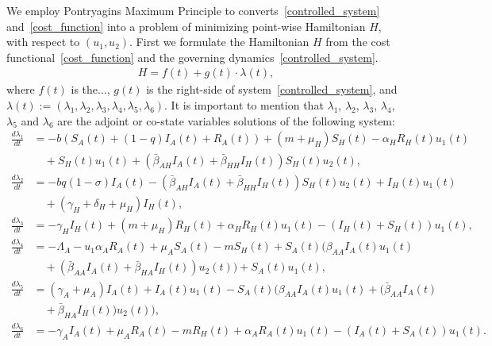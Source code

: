\documentclass[11pt]{amsart}
\theoremstyle{definition}
\numberwithin{equation}{section}
\begin{document}
    We employ Pontryagins Maximum Principle to converts~\eqref{controlled_system} and~\eqref{cost_function} into a problem of minimizing point-wise Hamiltonian $H$, with respect to $(u_{1},u_{2})$. First we formulate the Hamiltonian $H$ from the cost functional~\eqref{cost_function} and the governing dynamics~\eqref{controlled_system}.
    \begin{equation}
        \begin{aligned}
            H = f(t) + g(t)\cdot \lambda(t),
         \end{aligned}
    \end{equation}
    where $f(t)$ is the..., $g(t)$ is the right-side of system~\eqref{controlled_system}, and $\lambda(t) := \left( \lambda_{1}, \lambda_{2}, \lambda_{3}, \lambda_{4}, \lambda_{5}, \lambda_{6} \right)$. It is important to mention that $\lambda_{1}$, $\lambda_{2}$, $\lambda_{3}$, $\lambda_{4}$, $\lambda_{5}$ and $\lambda_{6}$ are the adjoint or co-state variables solutions of the following system:
    \begin{equation}\label{adjoint_system}
    \begin{aligned}
        \frac{d \lambda_{1}}{dt} &=
        -b (S_{A}(t) + (1 - q) I_{A}(t) + R_{A}(t) ) + (m + \mu_{H}) S_{H}(t) - \alpha_{H} R_{H}(t) u_{1}(t)\\
        &\quad+ S_{H}(t) u_{1}(t) + (\bar{\beta}_{AH} I_{A}(t) + \bar{\beta}_{HH} I_{H}(t)) S_{H}(t) u_{2}(t),
        \\
        \frac{d \lambda_{2}}{dt} &=
        -b q (1 - \sigma) I_{A}(t) - (\bar{\beta}_{AH} I_{A}(t) + \bar{\beta}_{HH} I_{H}(t)) S_{H}(t) u_{2}(t)  + I_{H}(t) u_{1}(t)\\
        &\quad + (\gamma_{H} + \delta_{H} + \mu_{H}) I_{H}(t),
        \\
        \frac{d \lambda_{3}}{dt} &=
        -\gamma_{H} I_{H}(t) + (m + \mu_{H}) R_{H}(t) + \alpha_{H} R_{H}(t) u_{1}(t) - (I_{H}(t) + S_{H}(t)) u_{1}(t),
        \\[0.3cm]
        \frac{d \lambda_{4}}{dt} &=
        -\Lambda_{A} - u_{1} \alpha_{A} R_{A}(t) + \mu_{A} S_{A}(t) - m S_{H}(t) + S_{A}(t) (\beta_{AA} I_{A}(t) u_{1}(t)\\
        &\quad + (\bar{\beta}_{AA} I_{A}(t) + \bar{\beta}_{HA} I_{H}(t)) u_{2}(t)) + S_{A}(t) u_{1}(t),
        \\
        \frac{d \lambda_{5}}{dt} &=
        (\gamma_{A} + \mu_{A}) I_{A}(t) + I_{A}(t) u_{1}(t) - S_{A}(t) (\beta_{AA} I_{A}(t) u_{1}(t) + (\bar{\beta}_{AA} I_{A}(t)\\
        &\quad + \bar{\beta}_{HA} I_{H}(t)) u_{2}(t)),
        \\
        \frac{d \lambda_{6}}{dt} &=
        -\gamma_{A} I_{A}(t) + \mu_{A} R_{A}(t) - m R_{H}(t) + \alpha_{A} R_{A}(t) u_{1}(t) - (I_{A}(t) + S_{A}(t)) u_{1}(t).
    \end{aligned}
\end{equation}
\end{document}
